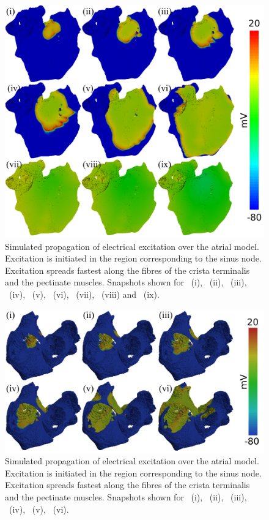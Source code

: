 \begin{figure}
\includegraphics{figures/atrium/validation/front_activation}
\caption[Snapshots of Electrical Activation under Sinus Rhythm (frontal)]{
\label{fig:atrium:validation:main}
Simulated propagation of electrical excitation over the atrial model.
Excitation is initiated in the region corresponding to the sinus node.
Excitation spreads fastest along the fibres of the crista terminalis and the
pectinate muscles.
Snapshots shown for \ (i), \ (ii), \ (iii), \ (iv),
\ (v), \ (vi), \ (vii), \ (viii) and \ (ix).
}
\end{figure}

\begin{figure}
\includegraphics{figures/atrium/validation/back_activation}
\caption[Snapshots of Electrical Activation under Sinus Rhythm (from ventricular
openings)]{
\label{fig:atrium:validation:valves}
Simulated propagation of electrical excitation over the atrial model.
Excitation is initiated in the region corresponding to the sinus node.
Excitation spreads fastest along the fibres of the crista terminalis and the
pectinate muscles.
Snapshots shown for \ (i), \ (ii), \ (iii), \ (iv),
\ (v), \ (vi).
}
\end{figure}

